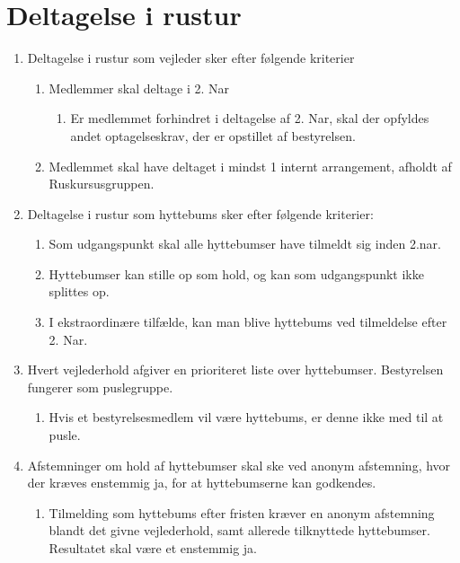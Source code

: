 \documentclass[a4paper, 10pt]{article}
\renewcommand\thesection{\textsection\arabic{section}}
\newenvironment{stykenum}{
  \begin{enumerate}[%
    label=Stk.~\arabic*:, ref=\textsection~\theenumi~Stk.~\arabic*, start=1]
}{\end{enumerate}}
\newenvironment{substykenum}{
  \begin{enumerate}[%
          label=Stk.~\arabic{enumi}.\arabic*:,
      ref=\thesection~Stk.~\arabic{enumi}.\arabic*, start=1]
}{\end{enumerate}}
\newenvironment{subsubstykenum}{
  \begin{enumerate}[%
      label=Stk.~\arabic{enumi}.\arabic{enumii}.\arabic*:,
      ref=\thesection~Stk.~\arabic{enumi}.\arabic{enumii}.\arabic*, start=1]
}{\end{enumerate}}
\begin{document}
\section{Deltagelse i rustur}
\begin{stykenum}
\item Deltagelse i rustur som vejleder sker efter følgende kriterier
    \begin{substykenum}
        \item Medlemmer skal deltage i 2. Nar
        \begin{subsubstykenum}
            \item Er medlemmet forhindret i deltagelse af 2. Nar, skal der
                opfyldes andet optagelseskrav, der er opstillet af bestyrelsen.
        \end{subsubstykenum}

        \item Medlemmet skal have deltaget i mindst 1 internt arrangement,
            afholdt af Ruskursusgruppen.
    \end{substykenum}

    \item Deltagelse i rustur som hyttebums sker efter følgende kriterier:
    \begin{substykenum}
        \item Som udgangspunkt skal alle hyttebumser have tilmeldt sig inden
            2.nar.
        \item Hyttebumser kan stille op som hold, og kan som udgangspunkt ikke
            splittes op.
        \item I ekstraordinære tilfælde, kan man blive hyttebums ved tilmeldelse
            efter 2. Nar.
    \end{substykenum}
    \item Hvert vejlederhold afgiver en prioriteret liste over hyttebumser.
        Bestyrelsen fungerer som puslegruppe.
        \begin{substykenum}
            \item Hvis et bestyrelsesmedlem vil være hyttebums, er denne ikke
                med til at pusle.
        \end{substykenum}
    \item Afstemninger om hold af hyttebumser skal ske ved anonym afstemning,
        hvor der kræves enstemmig ja, for at hyttebumserne kan godkendes.
        \begin{substykenum}
            \item Tilmelding som hyttebums efter fristen kræver en anonym
                afstemning blandt det givne vejlederhold, samt allerede
                tilknyttede hyttebumser. Resultatet skal være et enstemmig ja.
        \end{substykenum}
\end{stykenum}
\end{document}
